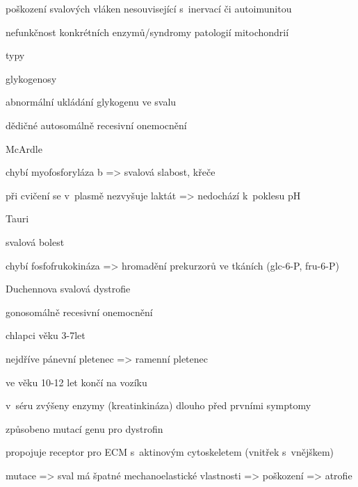 \documentclass[DIV=8]{scrreprt}
\begin{document}
\begin{myItemize}[nosep]
    \item poškození svalových vláken nesouvisející s inervací či autoimunitou
    \item nefunkčnost konkrétních enzymů/syndromy patologií mitochondrií
    \item typy
\begin{myItemize}[nosep]
    \item glykogenosy
\begin{myItemize}[nosep]
    \item abnormální ukládání glykogenu ve svalu
    \item dědičné autosomálně recesivní onemocnění
\end{myItemize}

    \item McArdle
\begin{myItemize}[nosep]
    \item chybí myofosforyláza b => svalová slabost, křeče
    \item při cvičení se v plasmě nezvyšuje laktát => nedochází k poklesu pH
\end{myItemize}

    \item Tauri
\begin{myItemize}[nosep]
    \item svalová bolest
    \item chybí fosfofrukokináza => hromadění prekurzorů ve tkáních (glc-6-P, fru-6-P)
\end{myItemize}

    \item Duchennova svalová dystrofie
\begin{myItemize}[nosep]
    \item gonosomálně recesivní onemocnění
    \item chlapci věku 3-7let
    \item nejdříve pánevní pletenec => ramenní pletenec
    \item ve věku 10-12 let končí na vozíku
    \item v séru zvýšeny enzymy (kreatinkináza) dlouho před prvními symptomy
    \item způsobeno mutací genu pro dystrofin
\begin{myItemize}[nosep]
    \item propojuje receptor pro ECM s aktinovým cytoskeletem (vnitřek s vnějškem)
    \item mutace => sval má špatné mechanoelastické vlastnosti => poškození => atrofie
\end{myItemize}


\end{myItemize}
\end{myItemize}
\end{myItemize}
\end{document}

